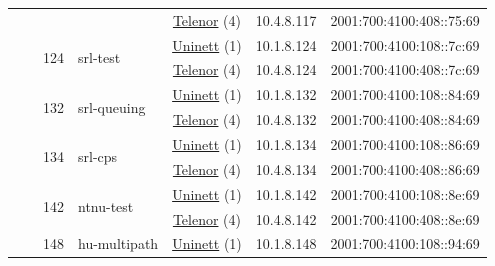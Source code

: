 \begin{small}
\begin{center}
\begin{longtable}{|c|c|c|c|c|c|c|c|}
  &  &  &  & \multicolumn{2}{|c|}{\tiny{\href{https://www.telenor.no}{Telenor} (4)}} & \tiny{10.4.8.117} & \tiny{2001:700:4100:408::75:69} \\* \cline{3-3}\cline{4-4}\cline{5-5}\cline{6-6}\cline{7-7}\cline{8-8}
  &  & \multirow{2}{*}{\tiny{124}} & \multicolumn{1}{|l|}{\multirow{2}{*}{\tiny{srl-test}}} & \multicolumn{2}{|c|}{\tiny{\href{https://www.uninett.no}{Uninett} (1)}} & \tiny{10.1.8.124} & \tiny{2001:700:4100:108::7c:69} \\* \cline{5-5}\cline{6-6}\cline{7-7}\cline{8-8}
  &  &  &  & \multicolumn{2}{|c|}{\tiny{\href{https://www.telenor.no}{Telenor} (4)}} & \tiny{10.4.8.124} & \tiny{2001:700:4100:408::7c:69} \\* \cline{3-3}\cline{4-4}\cline{5-5}\cline{6-6}\cline{7-7}\cline{8-8}
  &  & \multirow{2}{*}{\tiny{132}} & \multicolumn{1}{|l|}{\multirow{2}{*}{\tiny{srl-queuing}}} & \multicolumn{2}{|c|}{\tiny{\href{https://www.uninett.no}{Uninett} (1)}} & \tiny{10.1.8.132} & \tiny{2001:700:4100:108::84:69} \\* \cline{5-5}\cline{6-6}\cline{7-7}\cline{8-8}
  &  &  &  & \multicolumn{2}{|c|}{\tiny{\href{https://www.telenor.no}{Telenor} (4)}} & \tiny{10.4.8.132} & \tiny{2001:700:4100:408::84:69} \\* \cline{3-3}\cline{4-4}\cline{5-5}\cline{6-6}\cline{7-7}\cline{8-8}
  &  & \multirow{2}{*}{\tiny{134}} & \multicolumn{1}{|l|}{\multirow{2}{*}{\tiny{srl-cps}}} & \multicolumn{2}{|c|}{\tiny{\href{https://www.uninett.no}{Uninett} (1)}} & \tiny{10.1.8.134} & \tiny{2001:700:4100:108::86:69} \\* \cline{5-5}\cline{6-6}\cline{7-7}\cline{8-8}
  &  &  &  & \multicolumn{2}{|c|}{\tiny{\href{https://www.telenor.no}{Telenor} (4)}} & \tiny{10.4.8.134} & \tiny{2001:700:4100:408::86:69} \\* \cline{3-3}\cline{4-4}\cline{5-5}\cline{6-6}\cline{7-7}\cline{8-8}
  &  & \multirow{2}{*}{\tiny{142}} & \multicolumn{1}{|l|}{\multirow{2}{*}{\tiny{ntnu-test}}} & \multicolumn{2}{|c|}{\tiny{\href{https://www.uninett.no}{Uninett} (1)}} & \tiny{10.1.8.142} & \tiny{2001:700:4100:108::8e:69} \\* \cline{5-5}\cline{6-6}\cline{7-7}\cline{8-8}
  &  &  &  & \multicolumn{2}{|c|}{\tiny{\href{https://www.telenor.no}{Telenor} (4)}} & \tiny{10.4.8.142} & \tiny{2001:700:4100:408::8e:69} \\* \cline{3-3}\cline{4-4}\cline{5-5}\cline{6-6}\cline{7-7}\cline{8-8}
  &  & \multirow{2}{*}{\tiny{148}} & \multicolumn{1}{|l|}{\multirow{2}{*}{\tiny{hu-multipath}}} & \multicolumn{2}{|c|}{\tiny{\href{https://www.uninett.no}{Uninett} (1)}} & \tiny{10.1.8.148} & \tiny{2001:700:4100:108::94:69} \\* \cline{5-5}\cline{6-6}\cline{7-7}\cline{8-8}

\end{longtable}
\end{center}
\end{small}
